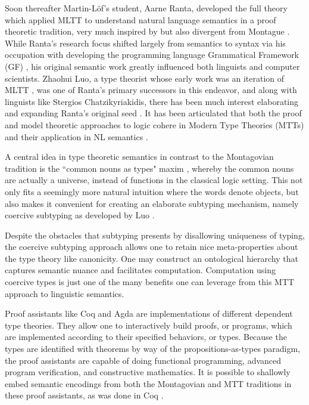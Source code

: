 \documentclass[a4paper, 11pt]{article}
\begin{document}
Soon thereafter Martin-Löf's student, Aarne Ranta, developed the full theory
which applied MLTT to understand natural language semantics in a proof theoretic
tradition, very much inspired by but also divergent from Montague
\cite{ranta1994type}. While Ranta's research focus shifted largely from
semantics to syntax via his occupation with developing the programming language
Grammatical Framework (GF) \cite{gf}, his original semantic work greatly
influenced both linguists and computer scientists. Zhaohui Luo, a type theorist
whose early work was an iteration of MLTT \cite{luobook} , was one of Ranta's
primary successors in this endeavor, and along with linguists like Stergios
Chatzikyriakidis, there has been much interest elaborating and expanding Ranta's
original seed \cite{cnTypes} \cite{luoSterg}. It has been articulated that both
the proof and model theoretic approaches to logic cohere in Modern Type
Theories (MTTs) and their application in NL semantics \cite{luoMt}.

A central idea in type theoretic semantics in contrast to the Montagovian
tradition is the ``common nouns as types" maxim \cite{cnTypes}, whereby the
common nouns are actually a universe, instead of functions in the classical
logic setting. This not only fits a seemingly more natural intuition where the
words denote objects, but also makes it convenient for creating an elaborate
subtyping mechanism, namely coercive subtyping as developed by Luo
\cite{luoCoer} \cite{luo13}.

Despite the obstacles that subtyping presents by disallowing uniqueness of
typing, the coercive subtyping approach allows one to retain nice
meta-properties about the type theory like canonicity. One may construct an
ontological hierarchy that captures semantic nuance and facilitates computation.
Computation using coercive types is just one of the many benefits one can
leverage from this MTT approach to linguistic semantics.

Proof assistants like Coq and Agda are implementations of different dependent
type theories. They allow one to interactively build proofs, or programs, which
are implemented according to their specified behaviors, or types. Because the
types are identified with theorems by way of the propositions-as-types paradigm,
the proof assistants are capable of doing functional programming, advanced
program verification, and constructive mathematics. It is possible to shallowly
embed semantic encodings from both the Montagovian and MTT traditions in these
proof assistants, as was done in Coq \cite{luoCoq} \cite{fracoq}.
\end{document}
